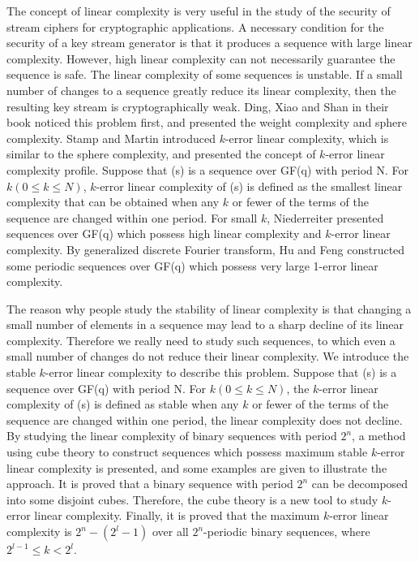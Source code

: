 \documentclass[10pt,conference,twocolumn]{IEEEtran}
\begin{document}
The concept of linear complexity is very useful in the study of the
security of stream ciphers for cryptographic applications. A
necessary condition for the security of a key stream generator is
that it produces a sequence with large linear complexity. However,
high linear complexity can not necessarily guarantee the sequence is
safe. The linear complexity of some sequences is unstable. If a
small number of changes to a sequence greatly reduce its linear
complexity, then the resulting key stream is cryptographically weak.
Ding, Xiao and Shan in their book \cite{Ding} noticed this problem
first, and presented the weight complexity and sphere complexity.
Stamp and Martin \cite{Stamp} introduced $k$-error linear
complexity, which is similar to the sphere complexity, and presented
the concept of $k$-error linear complexity profile. Suppose that (s)
is a sequence over GF(q) with period N. For $k(0\le k\le N)$,
$k$-error linear complexity of (s) is defined as the smallest linear
complexity that can be obtained when any $k$ or fewer of the terms
of the sequence are changed within one period. For small $k$,
Niederreiter \cite{Niederreiter} presented sequences over GF(q)
which possess high linear complexity and $k$-error linear
complexity. By generalized discrete Fourier transform, Hu and Feng
\cite{Hu} constructed some periodic sequences over GF(q) which
possess very large 1-error linear complexity.

The reason why people study the stability of linear complexity is
that changing a small number of elements in a sequence may lead to a
sharp decline of its linear complexity. Therefore we really need to
study such sequences, to which even a small number of changes do not
reduce their linear complexity. We introduce the stable $k$-error
linear complexity to describe this problem. Suppose that (s) is a
sequence over GF(q) with period N. For $k(0\le k\le N)$, the
$k$-error linear complexity of (s) is defined as stable when any $k$
or fewer of the terms of the sequence are changed within one period,
the linear complexity does not decline. By studying the linear
complexity of binary sequences with period $2^n$, a method using
cube theory to construct sequences which possess maximum stable
$k$-error linear complexity is presented, and some examples are
given to illustrate the approach.  It is  proved that a binary
sequence with period $2^n$ can be decomposed into some disjoint
cubes. Therefore, the cube theory is a new tool to study $k$-error
linear complexity. Finally, it is proved that the maximum  $k$-error
linear complexity is $2^n-(2^l-1)$ over all $2^n$-periodic binary
sequences, where $2^{l-1}\le k<2^{l}$.
\end{document}
